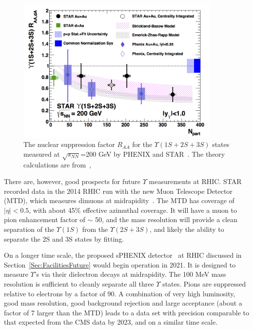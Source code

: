 \begin{figure}[!htb]
\centerline{
\includegraphics[width=0.9\textwidth]{fig/RHIC_Upsilons}
}
\caption[RHIC measurements of $\Upsilon$ production compared to theory]{The nuclear suppression factor $R_{AA}$ for the $\Upsilon(1S+2S+3S)$ states measured at $\sqrt{s_{NN}}$=200 GeV
by PHENIX\cite{Adare:2014hje} and STAR~\cite{Adamczyk:2013poh}. The theory calculations are from~\cite{Emerick:2011xu,Strickland:2011aa},
}
\label{fig:RHIC_Upsilons}
\end{figure}
	
There are, however, good prospects for future $\Upsilon$ measurements at RHIC. STAR recorded data in the 2014
RHIC run with the new Muon Telescope Detector (MTD), which measures dimuons at midrapidity~\cite{Ruan:2009ug}.
The MTD has coverage of $|\eta| < 0.5$, with about 45\% effective azimuthal coverage. It will have a
muon to pion enhancement factor of $\sim$ 50, and the mass resolution will provide a clean separation
of the $\Upsilon(1S)$ from the $\Upsilon(2S+3S)$, and likely the ability to separate the 2S and 3S states by fitting.
	
On a longer time scale, the proposed sPHENIX detector~\cite{Aidala:2012nz} at RHIC 
discussed in Section~\ref{Sec:FacilitiesFuture} would begin operation in
2021. It is designed to measure $\Upsilon$'s via their dielectron decays at midrapidity. The 100 MeV mass
resolution is sufficient to cleanly separate all three $\Upsilon$ states. Pions are suppressed relative to electrons
by a factor of 90. A combination of very high luminosity, good mass resolution, good background rejection and large
acceptance (about a factor of 7 larger than the MTD) leads to a data set with precision comparable to that expected
from the CMS data by 2023, and on a similar time scale.